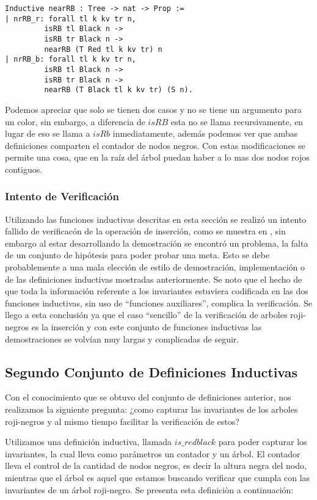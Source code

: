 \documentclass[letterpaper,12pt,oneside]{book}
\newcommand{\arn}{árbol roji-negro}
\newcommand{\arns}{arboles roji-negros}
\theoremstyle{plain}
\theoremstyle{definition}
\theoremstyle{remark}
\begin{document}
\begin{verbatim}
Inductive nearRB : Tree -> nat -> Prop :=
| nrRB_r: forall tl k kv tr n,
         isRB tl Black n ->
         isRB tr Black n ->
         nearRB (T Red tl k kv tr) n
| nrRB_b: forall tl k kv tr n,
         isRB tl Black n ->
         isRB tr Black n ->
         nearRB (T Black tl k kv tr) (S n).
\end{verbatim}
Podemos apreciar que solo se tienen dos casos y no se tiene un argumento para un color, sin embargo, a 
diferencia de $isRB$ esta no se llama recursivamente, en lugar de eso se llama a $isRb$ inmediatamente, 
además podemos ver que ambas definiciones comparten el contador de nodos negros.
Con estas modificaciones se permite una cosa, que en la ra\'iz del \'arbol puedan haber a lo mas dos 
nodos rojos contiguos.

\subsubsection{Intento de Verificaci\'on}
Utilizando las funciones inductivas descritas en esta secci\'on se realiz\'o un intento fallido de 
verificac\'on de la operaci\'on de inserci\'on, como se muestra en \cite{appel}, sin embargo al estar 
desarrollando la demostraci\'on se encontró un problema, la falta de un conjunto de hipótesis para poder 
probar una meta. Esto se debe probablemente a una mala elección de estilo de demostraci\'on, 
implementaci\'on o de las definiciones inductivas mostradas anteriormente. Se noto que el hecho de que 
toda la informaci\'on referente a los invariantes estuviera codificada en las dos funciones inductivas, 
sin uso de ``funciones auxiliares'', complica la verificaci\'on. Se llego a esta conclusi\'on ya que el 
caso ``sencillo'' de la verificaci\'on de {\arns} es la inserci\'on y con este conjunto de funciones 
inductivas las demostraciones se volvían muy largas y complicadas de seguir.

\subsection{Segundo Conjunto de Definiciones Inductivas}

Con el conocimiento que se obtuvo del conjunto de definiciones anterior, nos realizamos la siguiente 
pregunta: ¿como capturar las invariantes de los {\arns} y al mismo tiempo facilitar la verificaci\'on de 
estos?

Utilizamos una definición inductiva, llamada $is\_redblack$ para poder capturar los invariantes, la cual lleva como parámetros un contador y un \'arbol. El contador lleva el control de la cantidad de nodos negros, es decir la altura negra del nodo, mientras que el \'arbol es aquel que estamos buscando
verificar que cumpla con las invariantes de un {\arn}. Se presenta esta definici\`on a continuaci\'on:
\end{document}
